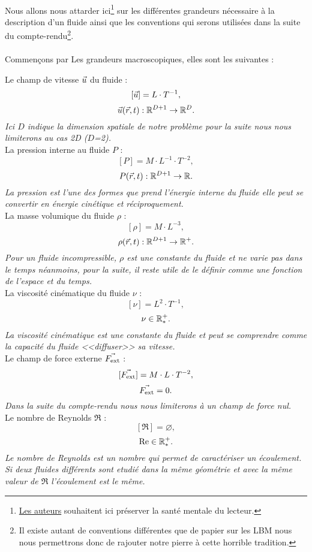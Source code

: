 \paragraph*{}
  Nous allons nous attarder ici\footnote{\hyperlink{authors}{Les auteurs} souhaitent ici préserver la santé mentale du
  lecteur.} sur les différentes grandeurs nécessaire à la description d'un fluide ainsi que les conventions qui serons
  utilisées dans la suite du compte-rendu\footnote{Il existe autant de conventions différentes que 
  de papier sur les LBM nous nous permettrons donc de rajouter notre pierre à cette horrible tradition.}.
  
\paragraph*{}
  Commençons par Les grandeurs macroscopiques, elles sont les suivantes :
  \begin{itemize} \label{eq:defmacro}
    \itemb Le champ de vitesse $\vec{u}$ du fluide :
    $$[\vec{u}] = L \cdot T^{-1},$$
    $$\vec{u}(\vec{r},t) : \mathbb{R}^{D+1} \to \mathbb{R}^D.$$
    \emph{Ici $D$ indique la dimension spatiale de notre problème pour la suite nous nous limiterons au cas 2D ($D$=2).}\\
    \itemb La pression interne au fluide $P$ :
    $$[P] = M\cdot L^{-1}\cdot T^{-2},$$
    $$P(\vec{r},t) : \mathbb{R}^{D+1} \to \mathbb{R}.$$
    \emph{La pression est l'une des formes que prend l'énergie interne du fluide elle peut se convertir en énergie 
    cinétique et réciproquement.}\\
    \itemb La masse volumique du fluide $\rho$ :
    $$[\rho] = M\cdot L^{-3},$$
    $$\rho(\vec{r},t) : \mathbb{R}^{D+1} \to \mathbb{R}^{+}.$$
    \emph{Pour un fluide incompressible, $\rho$ est une constante du fluide et ne varie pas dans le temps néanmoins, 
    pour la suite, il reste utile de le définir comme une fonction de l'espace et du temps.}\\
    \itemb La viscosité cinématique du fluide $\nu$ :
    $$[\nu] = L^{2}\cdot T^{-1},$$
    $$\nu \in \mathbb{R}^+_*.$$
    \emph{La viscosité cinématique est une constante du fluide et peut se comprendre comme la capacité du fluide
    <<diffuser>> sa vitesse.}\\
    \itemb Le champ de force externe $\vec{F_{\text{ext}}}$ :
    $$[\vec{F_{\text{ext}}}] = M\cdot L\cdot T^{-2},$$
    $$\vec{F_{\text{ext}}} = 0.$$
    \emph{Dans la suite du compte-rendu nous nous limiterons à un champ de force nul.}\\
    \itemb Le nombre de Reynolds $\Re$ :
    $$[\Re] = \varnothing,$$
    $$\text{Re} \in \mathbb{R}^+_*.$$
    \emph{Le nombre de Reynolds est un nombre qui permet de caractériser un écoulement. Si deux fluides différents sont 
    etudié dans la même géométrie et avec la même valeur de $\Re$ l'écoulement est le même.}
  \end{itemize}

